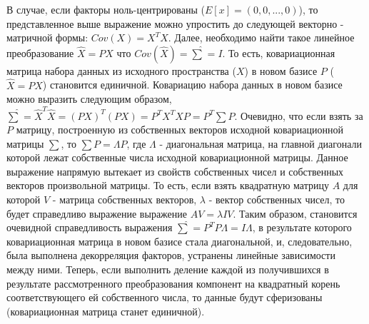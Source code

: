 \documentclass[runningheads]{llncs}
\begin{document}
В случае, если факторы ноль-центрированы ($E[x] = (0, 0, ...,0)$), то представленное выше выражение можно упростить до следующей векторно - матричной формы:  $Cov(X) = X^TX.$ Далее, необходимо найти такое линейное преобразование $\hat{X} = PX$ что $Cov(\hat{X}) = \hat{\sum} = I$. То есть, ковариационная матрица набора данных из исходного пространства ($X$) в новом базисе $P$ ($\hat{X} = PX$) становится единичной. Ковариацию набора данных в новом базисе можно выразить следующим образом,
$\hat{\sum} = \hat{X}^{T}\hat{X} = (PX)^T(PX) = P^TX^TXP = P^{T}\sum P$. Очевидно, что если взять за $P$ матрицу, построенную из собственных векторов исходной ковариационной матрицы $\sum$, то $\sum P = \Lambda P$, где  $\Lambda$ - диагональная матрица, на главной диагонали которой лежат собственные числа исходной ковариационной матрицы. Данное выражение напрямую вытекает из свойств собственных чисел и собственных векторов произвольной матрицы. То есть, если взять квадратную матрицу $A$ для которой $V$ - матрица собственных векторов, $\lambda$ - вектор собственных чисел, то будет справедливо выражение выражение $AV = \lambda IV$. Таким образом, становится очевидной справедливость выражения $\hat{\sum} = P^T P \Lambda = I \Lambda$, в результате которого ковариационная матрица в новом базисе стала диагональной, и, следовательно, была выполнена декорреляция факторов, устранены линейные зависимости между ними. Теперь, если выполнить деление каждой из получившихся в результате рассмотренного преобразования компонент на квадратный корень соответствующего ей собственного числа, то данные будут сферизованы (ковариационная матрица станет единичной).
\end{document}
